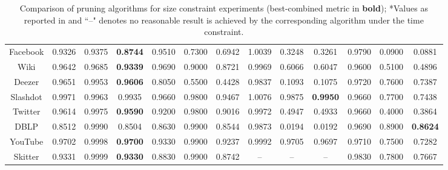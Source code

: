 \documentclass[letterpaper]{article} %
\begin{document}
\begin{table}[h]
{\begin{tabular}{|ccccccccccccc|}
\multicolumn{1}{|c||}{Facebook}& 0.9326& 0.9375& \multicolumn{1}{c||}{\textbf{0.8744}}& 0.9510& 0.7300& \multicolumn{1}{c||}{0.6942}& 1.0039& 0.3248& \multicolumn{1}{c||}{0.3261}& 0.9790& 0.0900& \multicolumn{1}{c|}{0.0881}\\
\multicolumn{1}{|c||}{Wiki}& 0.9642& 0.9685& \multicolumn{1}{c||}{\textbf{0.9339}}& 0.9690& 0.9000& \multicolumn{1}{c||}{0.8721}& 0.9969& 0.6066& \multicolumn{1}{c||}{0.6047}& 0.9600& 0.5100& \multicolumn{1}{c|}{0.4896}\\
\multicolumn{1}{|c||}{Deezer}& 0.9651& 0.9953& \multicolumn{1}{c||}{\textbf{0.9606}}& 0.8050& 0.5500& \multicolumn{1}{c||}{0.4428}& 0.9837& 0.1093& \multicolumn{1}{c||}{0.1075}& 0.9720& 0.7600& \multicolumn{1}{c|}{0.7387}\\
\multicolumn{1}{|c||}{Slashdot}& 0.9971& 0.9963& \multicolumn{1}{c||}{0.9935}& 0.9660& 0.9800& \multicolumn{1}{c||}{0.9467}& 1.0076& 0.9875& \multicolumn{1}{c||}{\textbf{0.9950}}& 0.9660& 0.7700& \multicolumn{1}{c|}{0.7438}\\
\multicolumn{1}{|c||}{Twitter}& 0.9614& 0.9975& \multicolumn{1}{c||}{\textbf{0.9590}}& 0.9200& 0.9800& \multicolumn{1}{c||}{0.9016}& 0.9972& 0.4947& \multicolumn{1}{c||}{0.4933}& 0.9660& 0.4000& \multicolumn{1}{c|}{0.3864}\\
\multicolumn{1}{|c||}{DBLP}& 0.8512& 0.9990& \multicolumn{1}{c||}{0.8504}& 0.8630& 0.9900& \multicolumn{1}{c||}{0.8544}& 0.9873& 0.0194& \multicolumn{1}{c||}{0.0192}& 0.9690& 0.8900& \multicolumn{1}{c|}{\textbf{0.8624}}\\
\multicolumn{1}{|c||}{YouTube}& 0.9702& 0.9998& \multicolumn{1}{c||}{\textbf{0.9700}}& 0.9330& 0.9900& \multicolumn{1}{c||}{0.9237}& 0.9992& 0.9705& \multicolumn{1}{c||}{0.9697}& 0.9710& 0.7500& \multicolumn{1}{c|}{0.7282}\\
\multicolumn{1}{|c||}{Skitter}& 0.9331& 0.9999& \multicolumn{1}{c||}{\textbf{0.9330}}& 0.8830& 0.9900& \multicolumn{1}{c||}{0.8742}& --& --& \multicolumn{1}{c||}{--}& 0.9830& 0.7800& \multicolumn{1}{c|}{0.7667}\\
\hline





  
\end{tabular}%
}
\caption{Comparison of pruning algorithms for size constraint experiments (best-combined metric in \textbf{bold}); *Values as reported in  \cite{ireland2022lense} and ``--" denotes no reasonable result is achieved by the corresponding algorithm under the time constraint.}
\label{tab:main}
\end{table}
\end{document}

